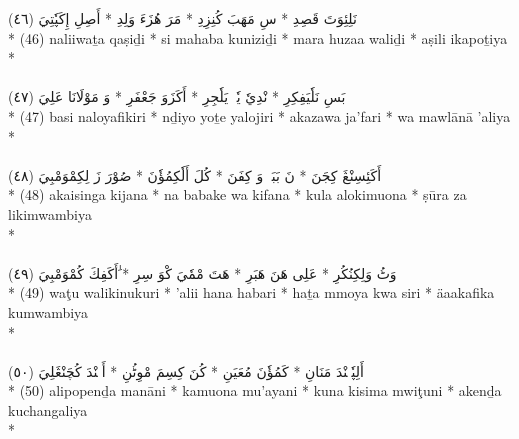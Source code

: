 \documentclass[a4paper, 12pt]{report}
\begin{document}
\begin{center}
\textarabic{(٤٦) \textcolor{mygreen}{نَلِئِوَتَ قَصِدِ  * سِ مَهَبَ كُنِزِدِ  * مَرَ هُزَءَ وَلِدِ  * أَصِلِ إِكَپٗتِيَ }} \\* 
(46) naliiwaṯa qaṣiḏi  * si mahaba kuniziḏi  * mara huzaa waliḏi  * aṣili ikapoṯiya  \\* 
 \\ 
\\[8mm] 

\textarabic{(٤٧) \textcolor{mygreen}{بَسِ نَلٗيَفِكِرِ  * نْدِيٗ يٗتٖ يَلٗجِرِ  * أَكَزَوَ جَعْفَرِ  * وَ مَوْلَانَا عَلِيَ }} \\* 
(47) basi naloyafikiri  * nḏiyo yoṯe yalojiri  * akazawa ja'fari  * wa mawlānā 'aliya  \\* 
 \\ 
\\[8mm] 

\textarabic{(٤٨) \textcolor{mygreen}{أَكَئِسِنْڠَ كِجَنَ  * نَ بَبَكٖ وَ كِفَنَ  * كُلَ أَلٗكِمُؤٗنَ  * صُوْرَ زَ لِكِمْوَمْبِيَ }} \\* 
(48) akaisinga kijana  * na babake wa kifana  * kula alokimuona  * ṣūra za likimwambiya  \\* 
 \\ 
\\[8mm] 

\textarabic{(٤٩) \textcolor{mygreen}{وَٹُ وَلِكِنُكُرِ  * عَلِى هَنَ هَبَرِ  * هَتَ مْمٗيَ كْوَ سِرِ  * َٰأَكَفِكَ كُمْوَمْبِيَ }} \\* 
(49) waţu walikinukuri  * 'alii hana habari  * haṯa mmoya kwa siri  * äaakafika kumwambiya  \\* 
 \\ 
\\[8mm] 

\textarabic{(٥٠) \textcolor{mygreen}{أَلِپٗپٖنْدَ مَنَانِ  * كَمُؤٗنَ مُعَيَنِ  * كُنَ كِسِمَ مْوِٹُنِ  * أَكٖنْدَ كُچَنْڠَلِيَ }} \\* 
(50) alipopenḏa manāni  * kamuona mu'ayani  * kuna kisima mwiţuni  * akenḏa kuchangaliya  \\* 
 \\ 
\\[8mm] 


\end{center}
\end{document}
